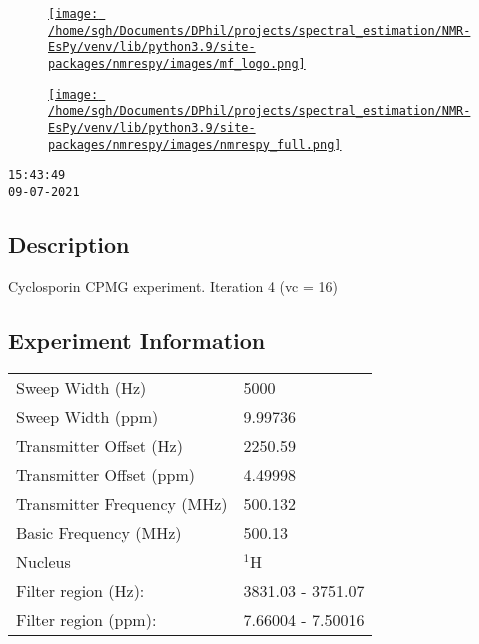\documentclass[8pt]{article}
\begin{document}
\begin{figure}[!ht]
\begin{minipage}[b][2.5cm][c]{.72\textwidth}
\href{http://foroozandeh.chem.ox.ac.uk/home}%
{\texttt{[image: /home/sgh/Documents/DPhil/projects/spectral\_estimation/NMR-EsPy/venv/lib/python3.9/site-packages/nmrespy/images/mf\_logo.png]}}
\end{minipage}
\begin{minipage}[b][2.5cm][c]{.27\textwidth}
\href{https://foroozandehgroup.github.io/NMR-EsPy}%
{\texttt{[image: /home/sgh/Documents/DPhil/projects/spectral\_estimation/NMR-EsPy/venv/lib/python3.9/site-packages/nmrespy/images/nmrespy\_full.png]}}
\end{minipage}
\end{figure}

\texttt{15:43:49\\09-07-2021}

\subsection*{Description}
Cyclosporin CPMG experiment.
Iteration 4 (vc = 16)

\subsection*{Experiment Information}
\hspace{-6pt}
\begin{tabular}{ll}
Sweep Width (Hz) & 5000 \\
Sweep Width (ppm) & 9.99736 \\
Transmitter Offset (Hz) & 2250.59 \\
Transmitter Offset (ppm) & 4.49998 \\
Transmitter Frequency (MHz) & 500.132 \\
Basic Frequency (MHz) & 500.13 \\
Nucleus & $^{1}$H \\
Filter region (Hz): & 3831.03 - 3751.07 \\
Filter region (ppm): & 7.66004 - 7.50016 \\

\end{tabular}
\end{document}

